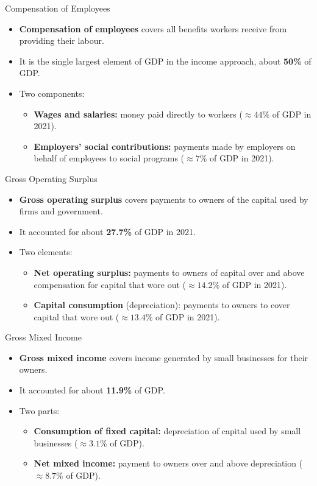 \documentclass[aspectratio=169]{beamer}
\begin{document}
\begin{frame}{Compensation of Employees}
\transfade
\begin{itemize}[<+->]
  \item \textbf{Compensation of employees} covers all benefits workers receive from providing their labour.
  \item It is the \alert{single largest} element of GDP in the income approach, about \textbf{50\%} of GDP.
  \item Two components:
  \begin{itemize}[<+->]
    \item \textbf{Wages and salaries:} money paid directly to workers (\(\approx 44\%\) of GDP in 2021).
    \item \textbf{Employers' social contributions:} payments made by employers on behalf of employees to social programs (\(\approx 7\%\) of GDP in 2021).
  \end{itemize}
\end{itemize}
\end{frame}

\begin{frame}{Gross Operating Surplus}
\transfade
\begin{itemize}[<+->]
  \item \textbf{Gross operating surplus} covers payments to owners of the \alert{capital} used by firms and government.
  \item It accounted for about \textbf{27.7\%} of GDP in 2021.
  \item Two elements:
  \begin{itemize}[<+->]
    \item \textbf{Net operating surplus:} payments to owners of capital over and above compensation for capital that wore out (\(\approx 14.2\%\) of GDP in 2021).
    \item \textbf{Capital consumption} (depreciation): payments to owners to cover capital that wore out (\(\approx 13.4\%\) of GDP in 2021).
  \end{itemize}
\end{itemize}
\end{frame}

\begin{frame}{Gross Mixed Income}
\transfade
\begin{itemize}[<+->]
  \item \textbf{Gross mixed income} covers income generated by small businesses for their owners.
  \item It accounted for about \textbf{11.9\%} of GDP.
  \item Two parts:
  \begin{itemize}[<+->]
    \item \textbf{Consumption of fixed capital:} depreciation of capital used by small businesses (\(\approx 3.1\%\) of GDP).
    \item \textbf{Net mixed income:} payment to owners over and above depreciation (\(\approx 8.7\%\) of GDP).
  \end{itemize}
\end{itemize}
\end{frame}
\end{document}
